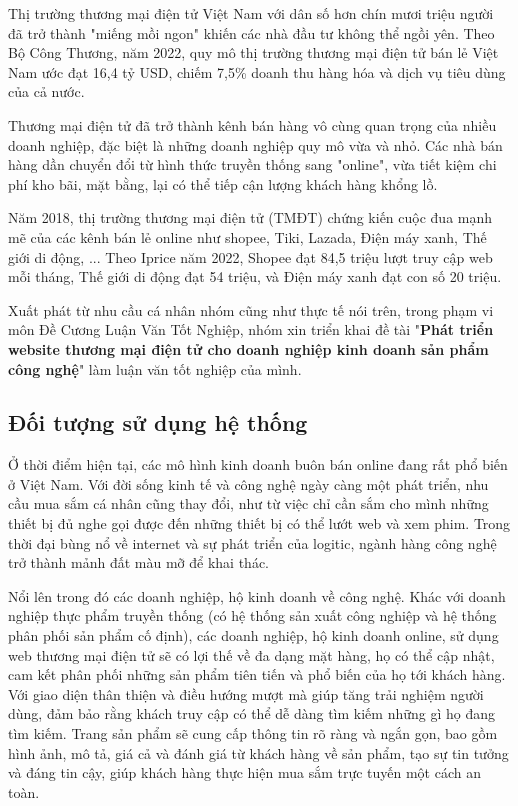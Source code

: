 Thị trường thương mại điện tử Việt Nam với dân số hơn chín mươi triệu người đã trở thành "miếng mồi ngon" khiến các nhà đầu tư không thể ngồi yên. Theo Bộ Công Thương, năm 2022, quy mô thị trường thương mại điện tử bán lẻ Việt Nam ước đạt 16,4 tỷ USD, chiếm 7,5\% doanh thu hàng hóa và dịch vụ tiêu dùng của cả nước.\\ \par

Thương mại điện tử đã trở thành kênh bán hàng vô cùng quan trọng của nhiều doanh nghiệp, đặc biệt là những doanh nghiệp quy mô vừa và nhỏ. Các nhà bán hàng dần chuyển đổi từ hình thức truyền thống sang "online", vừa tiết kiệm chi phí kho bãi, mặt bằng, lại có thể tiếp cận lượng khách hàng khổng lồ. \par

Năm 2018, thị trường thương mại điện tử (TMĐT) chứng kiến cuộc đua mạnh mẽ của các kênh bán lẻ online như shopee, Tiki, Lazada, Điện máy xanh, Thế giới di động, ... Theo Iprice năm 2022, Shopee đạt 84,5 triệu lượt truy cập web mỗi tháng, Thế giới di động đạt 54 triệu, và Điện máy xanh đạt con số 20 triệu. \\ \par

Xuất phát từ nhu cầu cá nhân nhóm cũng như thực tế nói trên, trong phạm vi môn Đề Cương Luận Văn Tốt Nghiệp, nhóm xin triển khai đề tài "\textbf{Phát triển website thương mại điện tử cho doanh nghiệp kinh
doanh sản phẩm công nghệ}" làm luận văn tốt nghiệp của mình. \par

\subsection{Đối tượng sử dụng hệ thống}

\par \hspace{\parindent} Ở thời điểm hiện tại, các mô hình kinh doanh buôn bán online đang rất phổ biến ở Việt
Nam. Với đời sống kinh tế và công nghệ ngày càng một phát triển, nhu cầu mua sắm cá nhân cũng thay đổi, như từ việc chỉ cần sắm cho mình những thiết bị đủ nghe gọi được đến những thiết bị có thể lướt web và xem phim. Trong thời đại bùng nổ về internet và sự phát triển của logitic, ngành hàng công nghệ trở thành mảnh đất màu mỡ để khai thác. \\\par

Nổi lên trong đó các doanh nghiệp, hộ kinh doanh về công nghệ. Khác với doanh nghiệp thực phẩm truyền thống (có hệ thống sản xuất công nghiệp và hệ thống phân phối sản phẩm cố định), các doanh nghiệp, hộ kinh doanh online, sử dụng web thương mại điện tử sẽ có lợi thế về đa dạng mặt hàng, họ có thể cập nhật, cam kết phân phối những sản phẩm tiên tiến và phổ biến của họ tới khách hàng. Với giao diện thân thiện và điều hướng mượt mà giúp tăng trải nghiệm người dùng, đảm bảo rằng khách truy cập có thể dễ dàng tìm kiếm những gì họ đang tìm kiếm. Trang sản phẩm sẽ cung cấp thông tin rõ ràng và ngắn gọn, bao gồm hình ảnh, mô tả, giá cả và đánh giá từ khách hàng về sản phẩm, tạo sự tin tưởng và đáng tin cậy, giúp khách hàng thực hiện mua sắm trực tuyến một cách an toàn.

